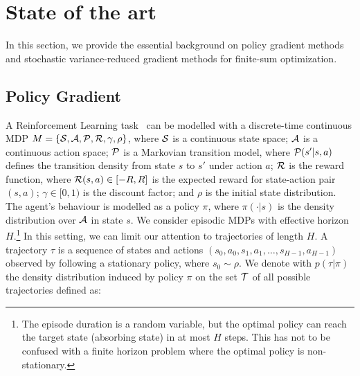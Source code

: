 \chapter{State of the art}\label{chap:art}

\vspace{-0.05in}
In this section, we provide the essential background on policy gradient methods and stochastic variance-reduced gradient methods for finite-sum optimization.
\vspace{-0.05in}

\section{Policy Gradient}\label{sec:PolicyGradient}
\vspace{-0.05in}
A Reinforcement Learning task~\citep{sutton1998reinforcement} can be modelled with a discrete-time continuous \acs{MDP} $M = \{\mathcal{S},\mathcal{A},\mathcal{P},\mathcal{R},\gamma,\rho\}$, where $\mathcal{S}$ is a continuous state space; $\mathcal{A}$ is a continuous action space; $\mathcal{P}$ is a Markovian transition model, where $\mathcal{P}(s'|s,a)$ defines the transition density from state $s$ to $s'$ under action $a$; $\mathcal{R}$ is the reward function, where $\mathcal{R}(s,a) \in [-R,R]$ is the expected reward for state-action pair $(s,a)$;
$\gamma\in[0,1)$ is the discount factor; and $\rho$ is the initial state distribution.
The agent's behaviour is modelled as a policy $\pi$, where $\pi(\cdot|s)$ is the density distribution over $\mathcal{A}$ in state $s$.
We consider episodic \acs{MDP}s with effective horizon $H$.\footnote{The episode duration is a random variable, but the optimal policy can reach the target state (\ie absorbing state) in at most $H$ steps. This has not to be confused with a finite horizon problem where the optimal policy is non-stationary.} In this setting, we can limit our attention to trajectories of length $H$. A trajectory $\tau$ is a sequence of states and actions $(s_0,a_0,s_1,a_1,\dots,s_{H-1},a_{H-1})$ observed by following a stationary policy, where $s_0 \sim \rho$.
We denote with $p(\tau|\pi)$ the density distribution induced by policy $\pi$ on the set $\mathcal{T}$ of all possible trajectories defined as:

